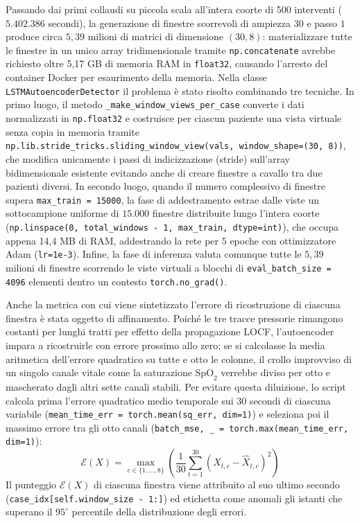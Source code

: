 Passando dai primi collaudi su piccola scala all'intera coorte di 500 interventi ($5.402.386$ secondi), la generazione di finestre scorrevoli di ampiezza $30$ e passo $1$ produce circa $5,39$ milioni di matrici di dimensione $(30, 8)$: materializzare tutte le finestre in un unico array tridimensionale tramite \texttt{np.concatenate} avrebbe richiesto oltre 5,17 GB di memoria RAM in \texttt{float32}, causando l'arresto del container Docker per esaurimento della memoria. Nella classe \texttt{LSTMAutoencoderDetector} il problema \`e stato risolto combinando tre tecniche. In primo luogo, il metodo \texttt{\_make\_window\_\allowbreak views\_per\_case} converte i dati normalizzati in \texttt{np.float32} e costruisce per ciascun paziente una vista virtuale senza copia in memoria tramite \texttt{np.lib.stride\_tricks.sliding\_window\_view(vals, window\_shape=(30, 8))}, che modifica unicamente i passi di indicizzazione (stride) sull'array bidimensionale esistente evitando anche di creare finestre a cavallo tra due pazienti diversi. In secondo luogo, quando il numero complessivo di finestre supera \texttt{max\_train = 15000}, la fase di addestramento estrae dalle viste un sottocampione uniforme di $15.000$ finestre distribuite lungo l'intera coorte (\texttt{np.linspace(0, total\_windows - 1, max\_train, dtype=int)}), che occupa appena 14,4 MB di RAM, addestrando la rete per $5$ epoche con ottimizzatore Adam (\texttt{lr=1e-3}). Infine, la fase di inferenza valuta comunque tutte le $5,39$ milioni di finestre scorrendo le viste virtuali a blocchi di \texttt{eval\_batch\_size = 4096} elementi dentro un contesto \texttt{torch.no\_grad()}.

Anche la metrica con cui viene sintetizzato l'errore di ricostruzione di ciascuna finestra \`e stata oggetto di affinamento. Poich\'e le tre tracce pressorie rimangono costanti per lunghi tratti per effetto della propagazione LOCF, l'autoencoder impara a ricostruirle con errore prossimo allo zero; se si calcolasse la media aritmetica dell'errore quadratico su tutte e otto le colonne, il crollo improvviso di un singolo canale vitale come la saturazione $\text{SpO}_2$ verrebbe diviso per otto e mascherato dagli altri sette canali stabili. Per evitare questa diluizione, lo script calcola prima l'errore quadratico medio temporale sui $30$ secondi di ciascuna variabile (\texttt{mean\_time\_err = torch.mean(sq\_err, dim=1)}) e seleziona poi il massimo errore tra gli otto canali (\texttt{batch\_mse, \_ = torch.max(mean\_time\_err, dim=1)}):
$$\mathcal{E}(X) = \max_{c \in \{1, \dots, 8\}} \left( \frac{1}{30} \sum_{t=1}^{30} (X_{t,c} - \hat{X}_{t,c})^2 \right)$$
Il punteggio $\mathcal{E}(X)$ di ciascuna finestra viene attribuito al suo ultimo secondo (\texttt{case\_idx[\allowbreak self.\allowbreak window\_size - 1:]}) ed etichetta come anomali gli istanti che superano il $95^\circ$ percentile della distribuzione degli errori.

